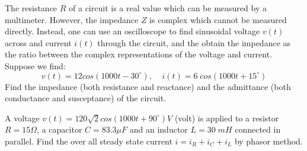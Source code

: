 \begin{enumerate}

% 
% 
% 
% 
% 
% 

\end{enumerate}


\item The resistance $R$ of a circuit is a real value which can be measured
by a multimeter. However, the impedance $Z$ is complex which cannot be 
measured directly. Instead, one can use an oscilloscope to find sinusoidal 
voltage $v(t)$ across and current $i(t)$ through the circuit, and the obtain
the impedance as the ratio between the complex representations of the voltage
and current. Suppose we find:
\[ v(t)=12 cos(1000t-30^\circ),\;\;\;\; i(t)=6\;cos(1000t+15^\circ) \]
Find the impedance (both resistance and reactance) and the admittance (both
conductance and susceptance) of the circuit.


\item A voltage $v(t)=120\sqrt{2} cos(1000t+90^\circ) V$ (volt) is applied to 
a resistor $R=15\Omega$, a capacitor $C=83.3\mu F$ and an inductor $L=30\; mH$ 
connected in parallel. Find the over all steady state current $i=i_R+i_C+i_L$ 
by phasor method.


